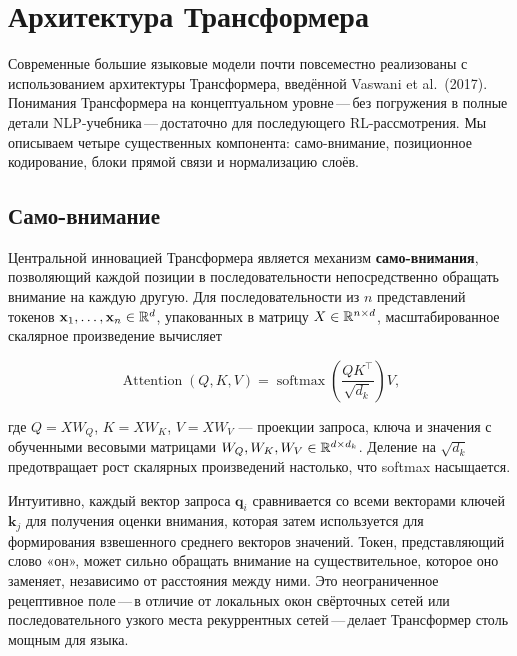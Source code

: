 \section{Архитектура Трансформера}
\label{sec:transformer}

Современные большие языковые модели почти повсеместно реализованы с использованием архитектуры Трансформера, введённой Vaswani et al.\ (2017). Понимания Трансформера на концептуальном уровне\,---\,без погружения в полные детали NLP-учебника\,---\,достаточно для последующего RL-рассмотрения. Мы описываем четыре существенных компонента: само-внимание, позиционное кодирование, блоки прямой связи и нормализацию слоёв.

\subsection{Само-внимание}

Центральной инновацией Трансформера является механизм \textbf{само-внимания}, позволяющий каждой позиции в последовательности непосредственно обращать внимание на каждую другую. Для последовательности из $n$ представлений токенов $\mathbf{x}_1, \ldots, \mathbf{x}_n \in \mathbb{R}^d$, упакованных в матрицу $X \in \mathbb{R}^{n \times d}$, масштабированное скалярное произведение вычисляет

\begin{equation}
\label{eq:self-attention}
\operatorname{Attention}(Q, K, V) = \operatorname{softmax}\!\left(\frac{QK^\top}{\sqrt{d_k}}\right) V,
\end{equation}

где $Q = XW_Q$, $K = XW_K$, $V = XW_V$ --- проекции запроса, ключа и значения с обученными весовыми матрицами $W_Q, W_K, W_V \in \mathbb{R}^{d \times d_k}$. Деление на $\sqrt{d_k}$ предотвращает рост скалярных произведений настолько, что softmax насыщается.

Интуитивно, каждый вектор запроса $\mathbf{q}_i$ сравнивается со всеми векторами ключей $\mathbf{k}_j$ для получения оценки внимания, которая затем используется для формирования взвешенного среднего векторов значений. Токен, представляющий слово «он», может сильно обращать внимание на существительное, которое оно заменяет, независимо от расстояния между ними. Это неограниченное рецептивное поле\,---\,в отличие от локальных окон свёрточных сетей или последовательного узкого места рекуррентных сетей\,---\,делает Трансформер столь мощным для языка.

